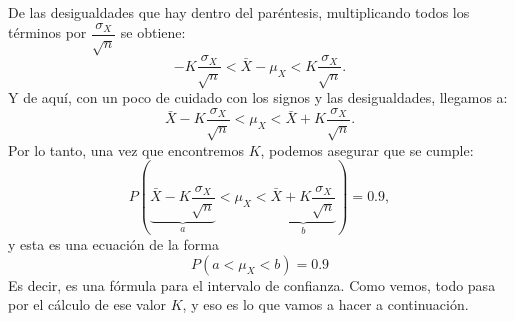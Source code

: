 De las desigualdades que hay dentro del paréntesis, multiplicando todos los
términos por $\dfrac{\sigma_X}{\sqrt{n}}$ se obtiene:
    \[
    -K\dfrac{\sigma_X}{\sqrt{n}}< \bar X-\mu_X<K\dfrac{\sigma_X}{\sqrt{n}}.
    \]
Y de aquí, con un poco de cuidado con los signos y las desigualdades, llegamos
a:
    \[
    \bar X-K\dfrac{\sigma_X}{\sqrt{n}}< \mu_X<\bar X+K\dfrac{\sigma_X}{\sqrt{n}}.
    \]
Por lo tanto, una vez que encontremos $K$, podemos asegurar que se cumple:
    \[
    P\left(\underbrace{\bar X-K\dfrac{\sigma_X}{\sqrt{n}}}_a< \mu_X<
    \underbrace{\bar X+K\dfrac{\sigma_X}{\sqrt{n}}}_b\right)=0.9,
    \]
y esta es una ecuación de la forma
\[P\left(a<\mu_X<b\right)=0.9\]
Es decir, es una fórmula para el intervalo de confianza. Como vemos, todo pasa
por el cálculo de ese valor $K$, y eso es lo que vamos a hacer a continuación.

